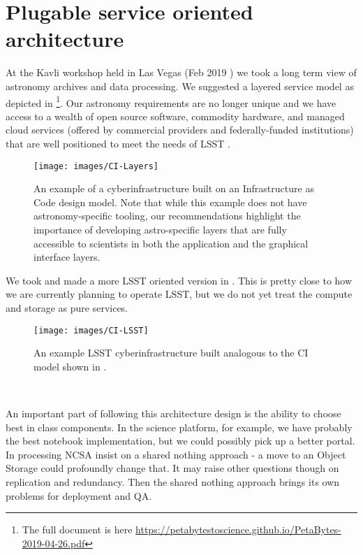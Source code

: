 
\section{Plugable service oriented architecture} \label{sec:arc}

At the Kavli workshop held in Las Vegas (Feb 2019 \cite{2019arXiv190505116B}) we took a long term view of astronomy archives and data processing.
We suggested a layered service model as depicted in \footnote{The full document is here \url{https://petabytestoscience.github.io/PetaBytes-2019-04-26.pdf}}.
Our astronomy requirements are no longer unique and we have access to a wealth of open source \gls{software}, commodity hardware, and managed \gls{cloud} services (offered by commercial providers and federally-funded institutions) that are well positioned to meet the needs of \gls{LSST} \cite{2019AAS...23345706M, 2019AAS...23324505B}.

\begin{figure}
    \centering
    \texttt{[image: images/CI-Layers]}
    \caption{An example of a \gls{cyberinfrastructure} built on an Infrastructure as Code design model. Note that while this example does not have astronomy-specific tooling, our recommendations highlight the importance of developing astro-specific layers that are fully accessible to scientists in both  the application  and the graphical interface layers. \label{fig:CI}}
\end{figure}


We took  and made a more \gls{LSST} oriented version in . This is pretty close to how we are currently planning to operate \gls{LSST}, but we do not yet treat the compute and storage as pure services.

\begin{figure}
    \centering
    \texttt{[image: images/CI-LSST]}
    \caption{An example \gls{LSST}  \gls{cyberinfrastructure} built analogous to the \gls{CI} model shown in .}
    \label{fig:CI-LSST}
\end{figure}\

An important part of following this architecture design is the ability to choose best in class components. In the science platform, for example, we have probably the best notebook implementation, but we could possibly pick up a better portal. In processing \gls{NCSA} insist on a shared nothing approach - a move to an \gls{Object Storage} could profoundly change that. It may raise other questions though on replication and redundancy. Then the shared nothing approach brings its own problems for deployment and \gls{QA}.

